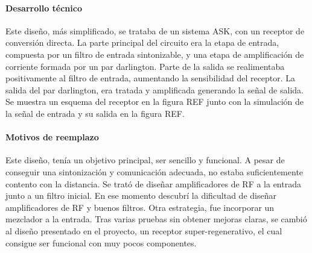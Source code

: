 \paragraph{Desarrollo técnico}
Este diseño, más simplificado, se trataba de un sistema ASK, con un receptor de conversión directa. 
La parte principal del circuito era la etapa de entrada, compuesta por un filtro de entrada sintonizable, y una etapa de amplificación de corriente formada por un par darlington. Parte de la salida se realimentaba positivamente al filtro de entrada, aumentando la sensibilidad del receptor. La salida del par darlington, era tratada y amplificada generando la señal de salida. 
Se muestra un esquema del receptor en la figura REF junto con la simulación de la señal de entrada y su salida en la figura REF.
\paragraph{Motivos de reemplazo}
Este diseño, tenía un objetivo principal, ser sencillo y funcional.
A pesar de conseguir una sintonización y comunicación adecuada, no estaba suficientemente contento con la distancia. Se trató de diseñar amplificadores de RF a la entrada junto a un filtro inicial. En ese momento descubrí la dificultad de diseñar amplificadores de RF y buenos filtros. Otra estrategia, fue incorporar un mezclador a la entrada. Tras varias pruebas sin obtener mejoras claras, se cambió al diseño presentado en el proyecto, un receptor super-regenerativo, el cual consigue ser funcional con muy pocos componentes.

